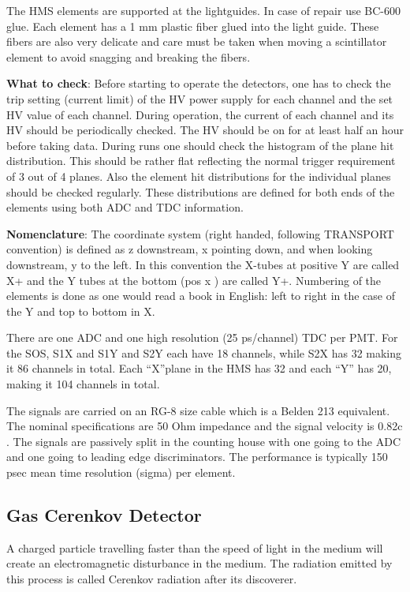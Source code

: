 The HMS elements are supported at the lightguides. In case of repair use BC-600
glue. Each element has a 1 mm plastic fiber glued into the light guide. These
fibers are also very delicate and care must be taken when moving a scintillator
element to avoid snagging and breaking the fibers.

{\bf What to check}: Before starting to operate the detectors, one has to
check the trip setting (current limit) of the HV power supply for each channel
and the set HV value of each channel. During operation, the current of each
channel and its HV should be periodically checked. The HV should be on for at
least half an hour before taking data. During runs one should check the
histogram of the plane hit distribution. This should be rather flat reflecting
the normal trigger requirement of 3 out of 4 planes. Also the element hit
distributions for the individual planes should be checked regularly. These
distributions are defined for both ends of the elements using both ADC and TDC
information.

{\bf Nomenclature}:
The coordinate system (right handed, following TRANSPORT
convention) is defined as z downstream, x pointing down, and when looking
downstream, y to the left. In this convention the X-tubes at positive Y are
called X+ and the Y tubes at the bottom (pos x ) are called Y+. Numbering of
the elements is done as one would read a book in English: left to right in the
case of the Y and top to bottom in X.

	There are one ADC and one high resolution (25 ps/channel) TDC per PMT.
For the SOS, S1X and S1Y and S2Y each have 18 channels, while S2X has 32 making
it 86 channels in total. Each ``X''plane in the HMS has 32 and each
``Y'' has 20, making it 104 channels in total.

	The signals are carried on an RG-8 size cable which is a Belden 213
equivalent. The nominal specifications are 50 Ohm impedance and the signal
velocity is 0.82c . The signals are passively split in the counting house with
one going to the ADC and one going to leading edge discriminators. The
performance is typically 150 psec mean time resolution (sigma) per
element.

\subsection{Gas Cerenkov Detector}

A charged particle travelling faster
than the speed of light in the medium will create an electromagnetic
disturbance in the medium. The radiation emitted by this process is
called Cerenkov radiation after its discoverer.

